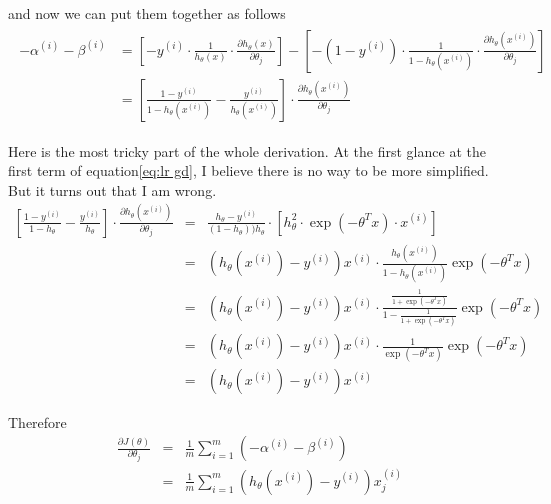 \documentclass{article} %
\begin{document}
and now we can put them together as follows
\begin{eqnarray}
\begin{split}
    - \alpha^{(i)} - \beta^{(i)} &= \left[ - y^{(i)} \cdot \frac{1}{h_{\theta}(x)} \cdot \frac{\partial h_\theta(x)}{\partial \theta_j} \right] - \left[ -(1-y^{(i)}) \cdot \frac{1}{1-h_\theta(x^{(i)})} \cdot \frac{\partial h_\theta(x^{(i)})}{\partial \theta_j} \right]\\
     &= \left[ \frac{1-y^{(i)}}{1-h_\theta(x^{(i)})} - \frac{y^{(i)}}{h_\theta(x^{(i)})} \right] \cdot \frac{\partial h_\theta(x^{(i)})}{\partial \theta_j}
\end{split}
     \label{eq:lr gd}
\end{eqnarray}

Here is the most tricky part of the whole derivation. At the first glance at the first term of equation\ref{eq:lr gd}, I believe there is no way to be more simplified. But it turns out that I am wrong.
\begin{eqnarray*}
    \left[ \frac{1-y^{(i)}}{1-h_\theta} - \frac{y^{(i)}}{h_\theta} \right] \cdot \frac{\partial h_\theta(x^{(i)})}{\partial \theta_j} &=& \frac{h_\theta - y^{(i)}}{(1- h_\theta)) h_\theta} \cdot \left[ h^2_\theta \cdot \exp(-\theta^T x) \cdot x^{(i)} \right]\\
    &=& (h_\theta(x^{(i)})-y^{(i)})x^{(i)} \cdot \frac{h_\theta(x^{(i)})}{1-h_\theta(x^{(i)})} \exp(-\theta^T x)\\
    &=& (h_\theta(x^{(i)})-y^{(i)})x^{(i)} \cdot \frac{\frac{1}{1+\exp(-\theta^T x)}}{1-\frac{1}{1+\exp(-\theta^T x)}} \exp(-\theta^T x)\\
    &=& (h_\theta(x^{(i)})-y^{(i)})x^{(i)} \cdot \frac{1}{\exp(-\theta^T x)}\exp(-\theta^T x)\\
    &=& (h_\theta(x^{(i)})-y^{(i)})x^{(i)}
\end{eqnarray*}

Therefore
\begin{eqnarray}
    \frac{\partial J(\theta)}{\partial \theta_j}&=& \frac{1}{m}\sum_{i=1}^m ( -\alpha^{(i)} - \beta^{(i)} )\\
    &=& \frac{1}{m}\sum_{i=1}^m (h_\theta(x^{(i)})-y^{(i)})x^{(i)}_j
\end{eqnarray}
\end{document}
